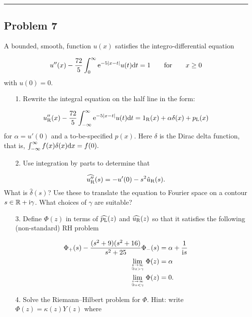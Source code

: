 \documentclass[12pt,a4paper]{article}
\def\qqfor{\qquad\hbox{for}\qquad}
\def\D{ {\rm d} }
\def\I{ {\rm i} }
\def\E{ {\rm e} }
\def\R{ {\mathbb R} }
\def\dx{\D x}
\def\dt{\D t}
\def\rR{ {\rm R} }
\def\rL{ {\rm L} }
\def\endash{–}
\begin{document}
\rule{\textwidth}{1pt}
\subsection{Problem 7}
A bounded, smooth,  function $u(x)$ satisfies the integro-differential equation

\[
u''(x) - {72 \over 5} \int_0^\infty \E^{-5 |x-t|} u(t) \dt = 1 \qqfor x \geq 0
\]
with $u(0) = 0$.

\begin{itemize}
\item[1. ] Rewrite the integral equation on the half line in the form:

\end{itemize}
\[
u_\rR''(x) - {72 \over 5} \int_{-\infty}^\infty \E^{-5 |x-t|} u(t) \dt = 1_\rR(x) + \alpha \delta(x) + p_\rL(x)
\]
for $\alpha = u'(0)$ and a to-be-specified  $p(x)$. Here $\delta$ is  the Dirac delta function, that is, $\int_{-\infty}^\infty f(x) \delta(x) \dx = f(0).$

\begin{itemize}
\item[2. ] Use integration by parts to determine that

\end{itemize}
\[
\widehat{u_{\rm R}''}(s) = -u'(0) -s^2 \hat u_{\rm R}(s).
\]
What is $\hat{\delta}(s)$? Use these to translate the equation to Fourier space on a contour $s \in \R + \I \gamma$. What choices of $\gamma$ are suitable?

\begin{itemize}
\item[3. ] Define $\Phi(z)$ in  terms of $\widehat{p_\rL}(z)$ and $\widehat{u_\rR}(z)$ so that it satisfies the following (non-standard) RH problem

\end{itemize}

\begin{align*}
\Phi_+(s) - {(s^2 + 9) (s^2+16) \over s^2+25} \Phi_-(s) &= \alpha + {1 \over \I s}\\
 \lim_{z \rightarrow \infty\atop \Im z > \gamma}  \Phi(z) &= \alpha \\
  \lim_{z \rightarrow \infty\atop \Im z < \gamma}  \Phi(z) &= 0.
\end{align*}
\begin{itemize}
\item[4. ] Solve the Riemann\ensuremath{\endash}Hilbert problem for $\Phi$. Hint: write $\Phi(z) = \kappa(z) Y(z)$ where

\end{itemize}
\end{document}
